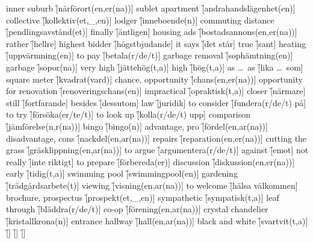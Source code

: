 \begin{questions}
\begin{multicols}{2}
        \question inner suburb \f[närförort(en,er(na))]
        \question sublet apartment \f[andrahandslägenhet(en)]
        \question collective \f[kollektiv(et,\_,en)]
        \question lodger \f[inneboende(n)]
        \question commuting distance \f[pendlingsavstånd(et)]
        \question finally \f[äntligen]
        \question housing ads \f[bostadsannons(en,er(na))]
        \question rather \f[hellre]
        \question highest bidder \f[högstbjudande]
        \question it says \f[det står]
        \question true \f[sant]
        \question heating \f[uppvärmning(en)]
        \question to pay \f[betala(r/de/t)]
        \question garbage removal \f[sophämtning(en)]
        \question garbage \f[sopor(na)]
        \question very high \f[jättehög(t,a)]
        \question high \f[hög(t,a)]
        \question as \ldots\ as \f[lika \ldots\ som]
        \question square meter \f[kvadrat(vard)]
        \question chance, opportunity \f[chans(en,er(na))]
        \question opportunity for renovation \f[renoveringschans(en)]
        \question impractical \f[opraktisk(t,a)]
        \question closer \f[närmare]
        \question still \f[fortfarande]
        \question besides \f[dessutom]
        \question law \f[juridik]
        \question to consider \f[fundera(r/de/t) på]
        \question to try \f[försöka(er/te/t)]
        \question to look up \f[kolla(r/de/t) upp]
        \question comparison \f[jämförelse(n,r(na))]
        \question bingo \f[bingo(n)]
        \question advantage, pro \f[fördel(en,ar(na))]
        \question disadvantage, cons \f[nackdel(en,ar(na))]
        \question repairs \f[reparation(en,er(na))]
        \question cutting the grass \f[gräsklippning(en,ar(na))]
        \question to argue \f[argumentera(r/de/t)]
        \question against \f[emot]
        \question not really \f[inte riktigt]
        \question to prepare \f[förbereda(er)]
        \question discussion \f[diskussion(en,er(na))]
        \question early \f[tidig(t,a)]
        \question swimming pool \f[swimmingpool(en)]
        \question gardening \f[trädgårdsarbete(t)]
        \question viewing \f[visning(en,ar(na))]
        \question to welcome \f[hälsa välkommen]
        \question brochure, prospectus \f[prospekt(et,\_,en)]
        \question sympathetic \f[sympatisk(t,a)]
        \question leaf through \f[bläddra(r/de/t)]
        \question co-op \f[förening(en,ar(na))]
        \question crystal chandelier \f[kristallkrona(n)]
        \question entrance hallway \f[hall(en,ar(na))]
        \question black and white \f[svartvit(t,a)]
        \question  \f[]
        \question  \f[]
        \question  \f[]

\end{multicols}
\end{questions}
